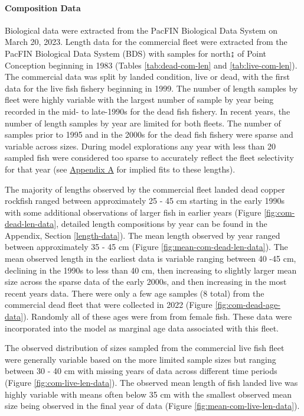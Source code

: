 \documentclass[11pt,
  english,
  letterpaper,
]{article}
\begin{document}
\hypertarget{composition-data}{%
\paragraph{Composition Data}\label{composition-data}}

\hfill\break

Biological data were extracted from the PacFIN Biological Data System on March 20, 2023. Length data for the commercial fleet were extracted from the PacFIN Biological Data System (BDS) with samples for north↨ of Point Conception beginning in 1983 (Tables \ref{tab:dead-com-len} and \ref{tab:live-com-len}). The commercial data was split by landed condition, live or dead, with the first data for the live fish fishery beginning in 1999. The number of length samples by fleet were highly variable with the largest number of sample by year being recorded in the mid- to late-1990s for the dead fish fishery. In recent years, the number of length samples by year are limited for both fleets. The number of samples prior to 1995 and in the 2000s for the dead fish fishery were sparse and variable across sizes. During model explorations any year with less than 20 sampled fish were considered too sparse to accurately reflect the fleet selectivity for that year (see \protect\hyperlink{excluded-data}{Appendix A} for implied fits to these lengths).

The majority of lengths observed by the commercial fleet landed dead copper rockfish ranged between approximately 25 - 45 cm starting in the early 1990s with some additional observations of larger fish in earlier years (Figure \ref{fig:com-dead-len-data}, detailed length compositions by year can be found in the Appendix, Section \ref{length-data}). The mean length observed by year ranged between approximately 35 - 45 cm (Figure \ref{fig:mean-com-dead-len-data}). The mean observed length in the earliest data is variable ranging between 40 -45 cm, declining in the 1990s to less than 40 cm, then increasing to slightly larger mean size across the sparse data of the early 2000s, and then increasing in the most recent years data. There were only a few age samples (8 total) from the commercial dead fleet that were collected in 2022 (Figure \ref{fig:com-dead-age-data}). Randomly all of these ages were from from female fish. These data were incorporated into the model as marginal age data associated with this fleet.

The observed distribution of sizes sampled from the commercial live fish fleet were generally variable based on the more limited sample sizes but ranging between 30 - 40 cm with missing years of data across different time periods (Figure \ref{fig:com-live-len-data}). The observed mean length of fish landed live was highly variable with means often below 35 cm with the smallest observed mean size being observed in the final year of data (Figure \ref{fig:mean-com-live-len-data}).
\end{document}
